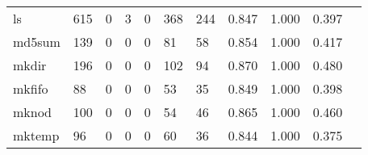 \begin{longtable}{lp{1.2cm}p{1.2cm}p{1.2cm}p{1.2cm}p{1.2cm}p{1.2cm}p{1.2cm}p{1.2cm}p{1.2cm}p{1.2cm}}
ls        &                                   615 &                                                  0 &                                                  3 &                                                  0 &                                                368 &                                                244 &                                              0.847 &                                              1.000 &                                              0.397 \\
md5sum    &                                   139 &                                                  0 &                                                  0 &                                                  0 &                                                 81 &                                                 58 &                                              0.854 &                                              1.000 &                                              0.417 \\
mkdir     &                                   196 &                                                  0 &                                                  0 &                                                  0 &                                                102 &                                                 94 &                                              0.870 &                                              1.000 &                                              0.480 \\
mkfifo    &                                    88 &                                                  0 &                                                  0 &                                                  0 &                                                 53 &                                                 35 &                                              0.849 &                                              1.000 &                                              0.398 \\
mknod     &                                   100 &                                                  0 &                                                  0 &                                                  0 &                                                 54 &                                                 46 &                                              0.865 &                                              1.000 &                                              0.460 \\
mktemp    &                                    96 &                                                  0 &                                                  0 &                                                  0 &                                                 60 &                                                 36 &                                              0.844 &                                              1.000 &                                              0.375 \\

\end{longtable}
